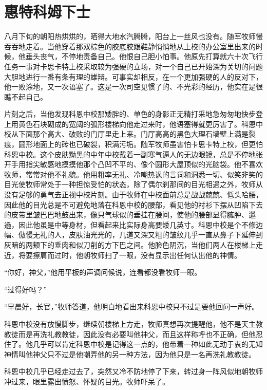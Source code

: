 \chapter{惠特科姆下士}
 
    八月下旬的朝阳热烘烘的，晒得大地水汽腾腾，阳台上一丝风也没有。随军牧师慢吞吞地走着。当他穿着那双棕色的胶底胶跟鞋静悄悄地从上校的办公室里出来的时候，他垂头丧气，不停地责备自己。他恨自己胆小怕事。他原先打算就六十次飞行任务一事对卡思卡特上校采取较为强硬的立场，对一个自己已开始深为关切的问题大胆地进行一番有条有理的雄辩。可事实却相反，在一个更加强硬的人的反对下，他一败涂地，又一次语塞了。这是一次司空见惯了的、不光彩的经历，他实在是很瞧不起自己。

    片刻之后，当他发现科恩中校那矮胖的、单色的身影正无精打采地急匆匆地快步登上用黄色石块砌成的宽阔的弧形楼梯向他走过来时，他语塞得就更厉害了。科恩中校从下面那个高大、破败的门厅里走上来。门厅高高的黑色大理石墙壁上满是裂痕，圆形地面上的砖也已破裂，积满污垢。随军牧师虽害怕卡思卡特上校，但更怕科恩中校。这个皮肤黝黑的中年中校戴着一副寒气逼人的无边眼镜，总是不停地张开手用指尖敏感地摸摸他那个凸凹不平的、像个圆形大屋顶似的光脑袋。他不喜欢牧师，常常对他不礼貌。他用粗率无礼、冷嘲热讽的言词和洞悉一切、似笑非笑的目光使牧师常处于一种担惊受怕的状态，除了偶尔刹那间的目光相遇之外，牧师从没有足够的勇气去正视中校片刻。由于牧师在中校面前总是战战兢兢、低头哈腰，因此他的目光总是不可避免地落在科恩中校的腰部，看见他的衬衫下摆从凹陷下去的皮带里皱巴巴地鼓出来，像只气球似的垂挂在腰间，使他的腰部显得臃肿、邋遢，因此他虽是中等身材，但看起来比实际身高要矮几英寸。科恩中校是个不修边幅、傲慢无礼的人，皮肤油光光的，几道又深又粗的皱纹几乎一直从鼻子下延伸到灰暗的两颊下的垂肉和似刀削的方下巴之间。他脸色阴沉，当他们两人在楼梯上走近，将要擦肩而过时，他朝牧师扫了一眼，没有显示出任何认出他的神情。

    “你好，神父，”他用平板的声调问候说，连看都没看牧师一眼。

    “过得好吗？”

    “早晨好，长官，”牧师答道，他明白地看出来科恩中校只不过是要他回问一声好。

    科恩中校没有放慢脚步，继续朝楼梯上方走，牧师真想再次提醒他，他不是天主教教徒而是再洗礼教教徒，因此没有必要叫他神父，而且这样称呼也不正确，但他忍住了。他几乎可以肯定科恩中校是记得这一点的，他带着一种如此无动于衷的无知神情叫他神父只不过是他嘲弄他的另一种方法，因为他只是一名再洗礼教教徒。

    科恩中校几乎已经走过去了，突然又冷不防地停了下来，转过身一阵风似地朝牧师冲过来，眼里露出愤怒、怀疑的目光。牧师吓呆了。

